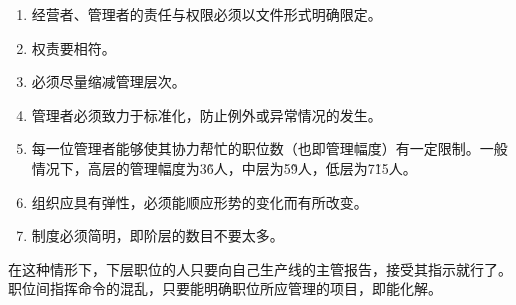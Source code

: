 \begin{enumerate}
\begin{enumerate}
                \item 经营者、管理者的责任与权限必须以文件形式明确限定。

                \item 权责要相符。

                \item 必须尽量缩减管理层次。

                \item 管理者必须致力于标准化，防止例外或异常情况的发生。

                \item 每一位管理者能够使其协力帮忙的职位数（也即管理幅度）有一定限制。一般情况下，高层的管理幅度为3\~6人，中层为5\~9人，低层为7\~15人。

                \item 组织应具有弹性，必须能顺应形势的变化而有所改变。

                \item 制度必须简明，即阶层的数目不要太多。
            \end{enumerate}

        在这种情形下，下层职位的人只要向自己生产线的主管报告，接受其指示就行了。职位间指挥命令的混乱，只要能明确职位所应管理的项目，即能化解。
    \end{enumerate}
